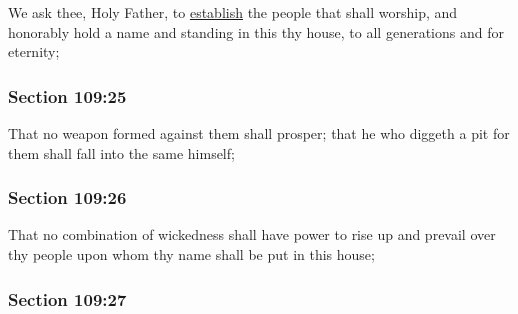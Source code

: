 		We ask thee, Holy Father, to \hyperref[ESTABLISH]{establish} the people that shall worship, and honorably hold a name and standing in this thy house, to all generations and for eternity;


	\subsubsection{Section 109:25} %
		\label{DC109-25}

		That no weapon formed against them shall prosper; that he who diggeth a pit for them shall fall into the same himself;


	\subsubsection{Section 109:26} %
		\label{DC109-26}

		That no combination of wickedness shall have power to rise up and prevail over thy people upon whom thy name shall be put in this house;


	\subsubsection{Section 109:27} %
		\label{DC109-27}

